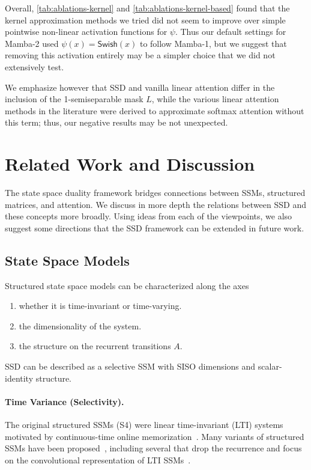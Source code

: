 Overall, \ref{tab:ablations-kernel} and \ref{tab:ablations-kernel-based} found that the kernel approximation methods we tried did not seem to improve over simple pointwise non-linear activation functions for $\psi$.
Thus our default settings for Mamba-2 used $\psi(x) = \mathsf{Swish}(x)$ to follow Mamba-1, but we suggest that removing this activation entirely may be a simpler choice that we did not extensively test.

We emphasize however that SSD and vanilla linear attention differ in the inclusion of the 1-semiseparable mask $L$, while the various linear attention methods in the literature were derived to approximate softmax attention without this term; thus, our negative results may be not unexpected.

\section{Related Work and Discussion}
\label{sec:related}

The state space duality framework bridges connections between SSMs, structured matrices, and attention. We discuss in more depth the relations between SSD and these concepts more broadly. Using ideas from each of the viewpoints, we also suggest some directions that the SSD framework can be extended in future work.

\subsection{State Space Models}
\label{sec:related:ssm}

Structured state space models can be characterized along the axes

\begin{enumerate}[label=(\roman*)]
  \item whether it is time-invariant or time-varying.
  \item the dimensionality of the system.
  \item the structure on the recurrent transitions $A$.
\end{enumerate}

SSD can be described as a selective SSM with SISO dimensions and scalar-identity structure.

\paragraph{Time Variance (Selectivity).} The original structured SSMs (S4) were linear time-invariant (LTI) systems~\citep{gu2023thesis,gu2022efficiently} motivated by continuous-time online memorization~\citep{gu2020hippo,gu2021combining,gu2023train}.
Many variants of structured SSMs have been proposed~\citep{gupta2022diagonal,gu2022parameterization,smith2023s5,ma2023mega,dao2023hungry}, including several that drop the recurrence and focus on the convolutional representation of LTI SSMs~\citep{li2023makes,poli2023hyena,fu2023simple,qin2023toeplitz}.

